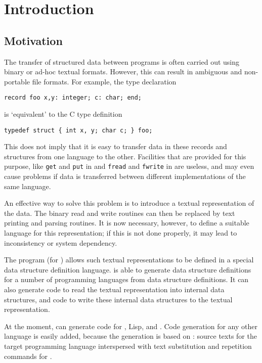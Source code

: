 \chapter{Introduction}
\label{s.intro}
\section{Motivation}
The transfer of structured data between programs is often carried out
using binary or ad-hoc textual formats.
However, this can result in ambiguous and non-portable file formats.
For example,
the {\Pascal} type declaration
\par
\begin{verbatim}
record foo x,y: integer; c: char; end;
\end{verbatim}
\par
is `equivalent' to the C type definition
\par
\begin{verbatim}
typedef struct { int x, y; char c; } foo;
\end{verbatim}
\par
This does not imply that it is easy to transfer data in these records
and structures from one language to the other.
Facilities that are provided for this purpose, like \texttt{get} and
\texttt{put} in {\Pascal} and \texttt{fread} and \texttt{fwrite} in {\C} are useless,
and may even cause problems if data is transferred between different
implementations of the same language.
\par
An effective way to solve this problem is to introduce a textual
representation of the data.
The binary read and write routines can then be replaced by text printing and
parsing routines.
It is now necessary,
however, to define a suitable language for this representation;
if this is not done properly,
it may lead to inconsistency or system dependency.
\par
The program  (for ) allows such textual
representations to be defined in
a special data structure definition language.
{\Tm} is able to generate data structure definitions for a number of
programming languages from {\Tm} data structure definitions.
It can also generate code to read the textual representation into
internal data structures, and code to write these internal data structures
to the textual representation.
\par
At the moment, {\Tm} can generate code for {\C}, Lisp, {\Miranda} and {\Pascal}.
Code generation for any other language is easily added,
because the generation is based on :
source texts for the target programming language
interspersed with text substitution and repetition commands for {\Tm}.

